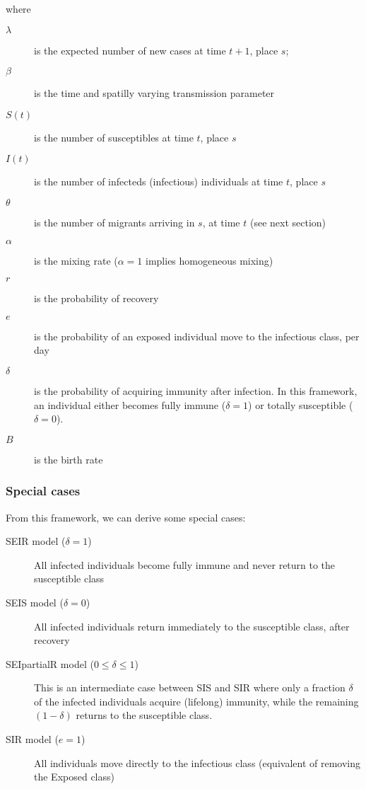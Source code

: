 \documentclass[a4paper,12pt]{article}
\begin{document}
where
\begin{description}
\item[$\lambda$]  is the expected number of new cases at time $t+1$, place $s$; 
\item[$\beta$]  is the time and spatilly varying transmission parameter 
\item[$S(t)$]  is the number of susceptibles at time $t$, place $s$
\item[$I(t)$]  is the number of infecteds (infectious) individuals at time $t$, place $s$ 
\item[$\theta$]  is the number of migrants arriving in $s$, at time $t$ (see next section)
\item[$\alpha$]  is the mixing rate ($\alpha=1$ implies homogeneous mixing)
\item[$r$]  is the probability of recovery
\item[$e$]  is the probability of an exposed individual move to the infectious class, per day
\item[$\delta$]  is the probability of acquiring immunity after infection. In this framework, an individual either becomes fully immune ($\delta = 1$) or totally susceptible ($\delta=0$). 
\item[$B$]  is the birth rate
\end{description}

\subsubsection{Special cases}
From this framework, we can derive some special cases:

\begin{description}
\item[SEIR model ($\delta = 1$)] All infected individuals become fully immune and never return to the susceptible class
\item[SEIS model ($\delta = 0$)] All infected individuals return immediately to the susceptible class, after recovery
\item[SEIpartialR model ($0 \leq \delta \leq 1$)] This is an intermediate case between SIS and SIR where only a fraction $\delta$ of the infected individuals acquire (lifelong) immunity, while the remaining $(1-\delta)$ returns to the susceptible class.   
\item[SIR model ($e=1$)]  All individuals move directly to the infectious class (equivalent of removing the Exposed class) 
\end{description}
\end{document}
